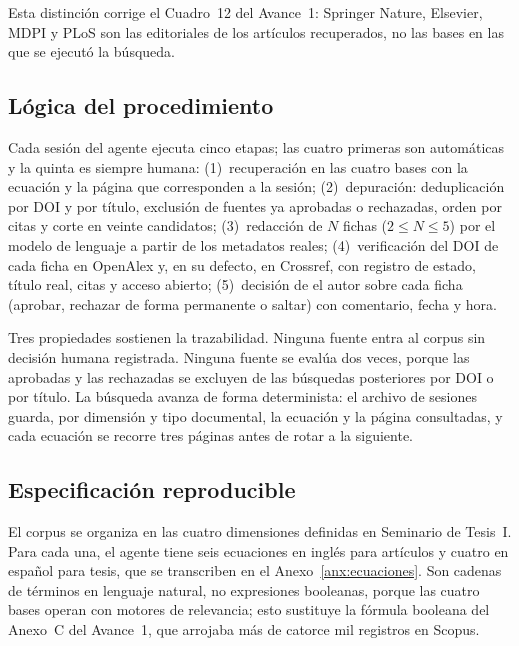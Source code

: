 Esta distinción corrige el Cuadro~12 del Avance~1: Springer Nature, Elsevier,
MDPI y PLoS son las editoriales de los artículos recuperados, no las bases en
las que se ejecutó la búsqueda.

\subsection{Lógica del procedimiento}

Cada sesión del agente ejecuta cinco etapas; las cuatro primeras son
automáticas y la quinta es siempre humana:
(1)~recuperación en las cuatro bases con la ecuación y la página que
corresponden a la sesión;
(2)~depuración: deduplicación por DOI y por título, exclusión de fuentes ya
aprobadas o rechazadas, orden por citas y corte en veinte candidatos;
(3)~redacción de $N$ fichas ($2 \le N \le 5$) por el modelo de lenguaje a
partir de los metadatos reales;
(4)~verificación del DOI de cada ficha en OpenAlex y, en su defecto, en
Crossref, con registro de estado, título real, citas y acceso abierto;
(5)~decisión de el autor sobre cada ficha (aprobar, rechazar de forma
permanente o saltar) con comentario, fecha y hora.

Tres propiedades sostienen la trazabilidad. Ninguna fuente entra al corpus
sin decisión humana registrada. Ninguna fuente se evalúa dos veces, porque las
aprobadas y las rechazadas se excluyen de las búsquedas posteriores por DOI o
por título. La búsqueda avanza de forma determinista: el archivo de sesiones
guarda, por dimensión y tipo documental, la ecuación y la página consultadas,
y cada ecuación se recorre tres páginas antes de rotar a la siguiente.

\subsection{Especificación reproducible}

El corpus se organiza en las cuatro dimensiones definidas en Seminario de
Tesis~I. Para cada una, el agente tiene seis ecuaciones en inglés para
artículos y cuatro en español para tesis, que se transcriben en el
Anexo~\ref{anx:ecuaciones}. Son cadenas de términos en lenguaje natural, no
expresiones booleanas, porque las cuatro bases operan con motores de
relevancia; esto sustituye la fórmula booleana del Anexo~C del Avance~1, que
arrojaba más de catorce mil registros en Scopus.

